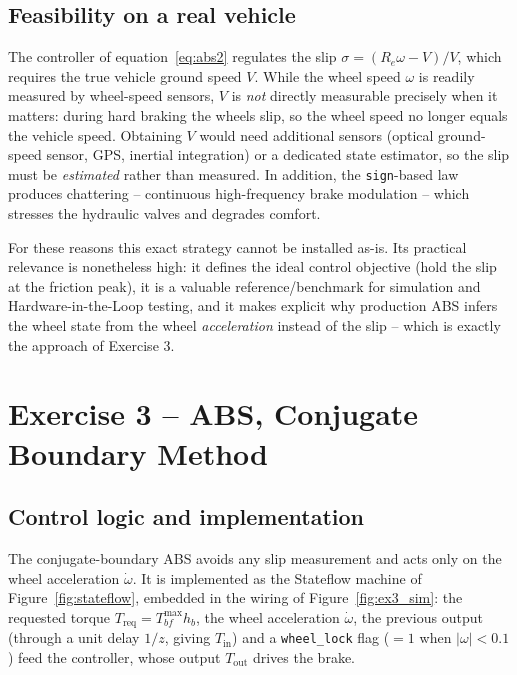 \subsection{Feasibility on a real vehicle}
The controller of equation~\eqref{eq:abs2} regulates the slip
$\sigma=(R_e\omega-V)/V$, which requires the true vehicle ground speed
$V$. While the wheel speed $\omega$ is readily measured by wheel-speed
sensors, $V$ is \emph{not} directly measurable precisely when it
matters: during hard braking the wheels slip, so the wheel speed no
longer equals the vehicle speed. Obtaining $V$ would need additional
sensors (optical ground-speed sensor, GPS, inertial integration) or a
dedicated state estimator, so the slip must be \emph{estimated} rather
than measured. In addition, the \texttt{sign}-based law produces
chattering -- continuous high-frequency brake modulation -- which
stresses the hydraulic valves and degrades comfort.

For these reasons this exact strategy cannot be installed as-is.
Its practical relevance is nonetheless high: it defines the ideal
control objective (hold the slip at the friction peak), it is a valuable
reference/benchmark for simulation and Hardware-in-the-Loop testing, and
it makes explicit why production ABS infers the wheel state from the
wheel \emph{acceleration} instead of the slip -- which is exactly the
approach of Exercise 3.

\section{Exercise 3 -- ABS, Conjugate Boundary Method}

\subsection*{Control logic and implementation}
The conjugate-boundary ABS avoids any slip measurement and acts only on
the wheel acceleration $\dot\omega$. It is implemented as the Stateflow
machine of Figure~\ref{fig:stateflow}, embedded in the wiring of
Figure~\ref{fig:ex3_sim}: the requested torque $T_\mathrm{req}=
T_{bf}^{\max}h_b$, the wheel acceleration $\dot\omega$, the previous
output (through a unit delay $1/z$, giving $T_\mathrm{in}$) and a
\texttt{wheel\_lock} flag ($=1$ when $|\omega|<0.1$) feed the
controller, whose output $T_\mathrm{out}$ drives the brake.

